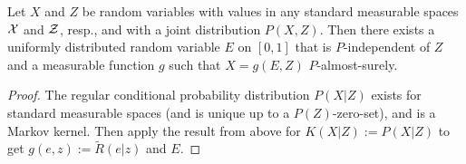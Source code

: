 \begin{Cor}    
    Let $X$ and $Z$ be random variables with values in any standard measurable spaces $\mathcal{X}$ and $\mathcal{Z}$, resp., and with a joint distribution $P(X,Z)$.
    Then there exists a uniformly distributed random variable $E$ on $[0,1]$ that is $P$-independent of $Z$ and a measurable function $g$ such that $X = g(E,Z)$ $P$-almost-surely.
    \begin{proof}
        The regular conditional probability distribution $P(X|Z)$ exists for standard measurable spaces (and is unique up to a $P(Z)$-zero-set), and is a Markov kernel. Then apply the result from above for $K(X|Z):=P(X|Z)$ to get $g(e,z):=\tilde R(e|z)$ and $E$.
    \end{proof}
\end{Cor}

